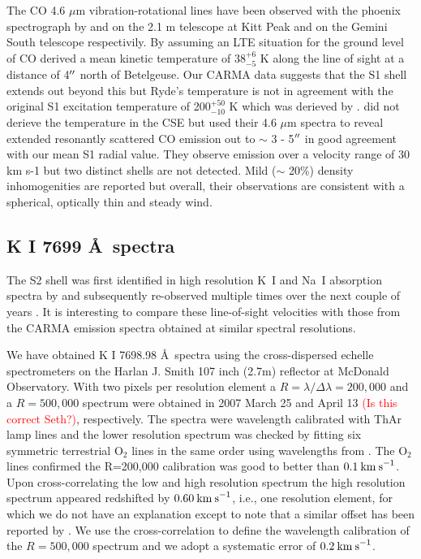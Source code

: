 \documentclass[apj]{emulateapj}
\begin{document}
The CO 4.6 $\mu$m vibration-rotational lines have been observed with the phoenix spectrograph by \cite{1999A&A...347L..35R} and \cite{2009AJ....137.3558S} on the 2.1 m telescope at Kitt Peak and on the Gemini South telescope respectivily. By assuming an LTE situation for the ground level of CO \cite{1999A&A...347L..35R}  derived a mean kinetic temperature of 38${}^{+6}_{-5}$ K along the line of sight at a distance of 4$\mbox{$^{\prime\prime}$}$ north of Betelgeuse. Our CARMA data suggests that the S1 shell extends out beyond this but Ryde's temperature is not in agreement with the original S1 excitation temperature of 200${}^{+50}_{-10}$ K which was derieved by \cite{1979ApJ...233L.135B}. \cite{2009AJ....137.3558S} did not derieve the temperature  in the CSE but used their  4.6 $\mu$m spectra to reveal extended resonantly scattered CO emission out to $\sim$ 3 - 5$\mbox{$^{\prime\prime}$}$ in good agreement with our mean S1 radial value. They observe emission over a velocity range of 30 km s-1 but two distinct shells are not detected. Mild ($\sim$ 20\%) density inhomogenities are reported but overall, their observations are consistent with a spherical, optically thin and steady wind.

\subsection{K I 7699 \AA \ spectra}

The S2 shell was first identified in high resolution K~I and Na~I absorption spectra by \cite{1975ApJ...199..427G} and subsequently re-observed multiple times over the next couple of years \citep{1979QJRAS..20..361G}. It is interesting to compare these line-of-sight velocities with those from the CARMA emission spectra obtained at similar spectral resolutions.

We have obtained K I 7698.98 \AA \ spectra using the cross-dispersed echelle spectrometers on the Harlan J. Smith 107 inch (2.7m) reflector at McDonald Observatory. With two pixels per resolution element a $R=\lambda/\Delta\lambda=200,000$ and a $R=500,000$ spectrum were obtained in 2007 March 25 and April 13 \textcolor{red}{(Is this correct Seth?)}, respectively. The spectra were wavelength calibrated with ThAr lamp lines and the lower resolution spectrum was checked by fitting six symmetric terrestrial O${}_2$ lines in the same order using wavelengths from \cite{1948ApJ...108..167B}. The O${}_2$ lines confirmed the R=200,000 calibration was good to better than $0.1\>{\rm km\>s}^{-1}$. Upon cross-correlating the low and high resolution spectrum the high resolution spectrum appeared redshifted by $0.60\>{\rm km\>s}^{-1}$, i.e., one resolution element, for which we do not have an explanation except to note that a similar offset has been reported by \cite{1994ApJ...436..152W}. We use the cross-correlation to define the wavelength calibration of the $R=500,000$ spectrum and we adopt a systematic error of $0.2\>{\rm km\>s}^{-1}$.
\end{document}
